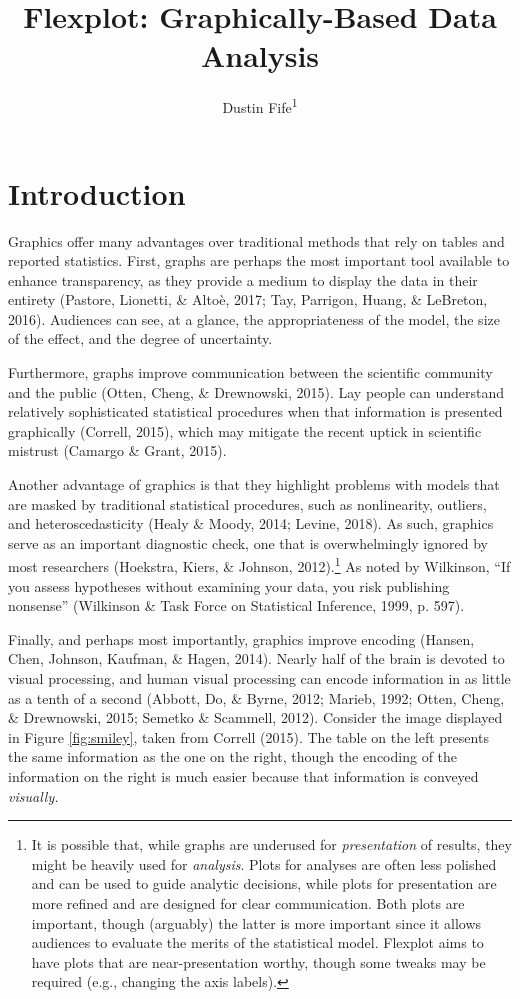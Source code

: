 \documentclass[
  english,
  man]{apa6}
\title{Flexplot: Graphically-Based Data Analysis}
\author{Dustin Fife\textsuperscript{1}}
\date{}
\affiliation{\vspace{0.5cm}\textsuperscript{1} Rowan University}
\begin{document}
\maketitle

\hypertarget{introduction}{%
\section{Introduction}\label{introduction}}

Graphics offer many advantages over traditional methods that rely on tables and reported statistics. First, graphs are perhaps the most important tool available to enhance transparency, as they provide a medium to display the data in their entirety (Pastore, Lionetti, \& Altoè, 2017; Tay, Parrigon, Huang, \& LeBreton, 2016). Audiences can see, at a glance, the appropriateness of the model, the size of the effect, and the degree of uncertainty.

Furthermore, graphs improve communication between the scientific community and the public (Otten, Cheng, \& Drewnowski, 2015). Lay people can understand relatively sophisticated statistical procedures when that information is presented graphically (Correll, 2015), which may mitigate the recent uptick in scientific mistrust (Camargo \& Grant, 2015).

Another advantage of graphics is that they highlight problems with models that are masked by traditional statistical procedures, such as nonlinearity, outliers, and heteroscedasticity (Healy \& Moody, 2014; Levine, 2018). As such, graphics serve as an important diagnostic check, one that is overwhelmingly ignored by most researchers (Hoekstra, Kiers, \& Johnson, 2012).\footnote{It is possible that, while graphs are underused for \emph{presentation} of results, they might be heavily used for \emph{analysis}. Plots for analyses are often less polished and can be used to guide analytic decisions, while plots for presentation are more refined and are designed for clear communication. Both plots are important, though (arguably) the latter is more important since it allows audiences to evaluate the merits of the statistical model. Flexplot aims to have plots that are near-presentation worthy, though some tweaks may be required (e.g., changing the axis labels).} As noted by Wilkinson, ``If you assess hypotheses without examining your data, you risk publishing nonsense'' (Wilkinson \& Task Force on Statistical Inference, 1999, p. 597).

Finally, and perhaps most importantly, graphics improve encoding (Hansen, Chen, Johnson, Kaufman, \& Hagen, 2014). Nearly half of the brain is devoted to visual processing, and human visual processing can encode information in as little as a tenth of a second (Abbott, Do, \& Byrne, 2012; Marieb, 1992; Otten, Cheng, \& Drewnowski, 2015; Semetko \& Scammell, 2012). Consider the image displayed in Figure \ref{fig:smiley}, taken from Correll (2015). The table on the left presents the same information as the one on the right, though the encoding of the information on the right is much easier because that information is conveyed \emph{visually.}
\end{document}
